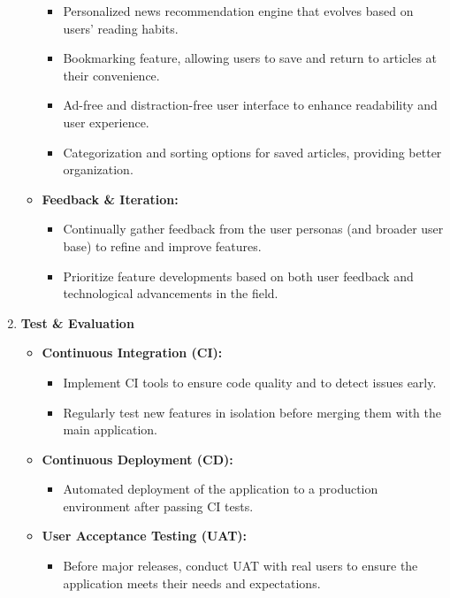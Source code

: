 \documentclass[a4paper]{article}
\begin{document}
\begin{enumerate}
\begin{itemize}
        \begin{itemize}
            \item Personalized news recommendation engine that evolves based on users' reading habits.
            \item Bookmarking feature, allowing users to save and return to articles at their convenience.
            \item Ad-free and distraction-free user interface to enhance readability and user experience.
            \item Categorization and sorting options for saved articles, providing better organization.
        \end{itemize}
        \item \textbf{Feedback \& Iteration:}
        \begin{itemize}
            \item Continually gather feedback from the user personas (and broader user base) to refine and improve features.
            \item Prioritize feature developments based on both user feedback and technological advancements in the field.
        \end{itemize}
    \end{itemize}
    \item \textbf{Test \& Evaluation}
    \begin{itemize}
        \item \textbf{Continuous Integration (CI):}
        \begin{itemize}
            \item Implement CI tools to ensure code quality and to detect issues early.
            \item Regularly test new features in isolation before merging them with the main application.
        \end{itemize}
        \item \textbf{Continuous Deployment (CD):}
        \begin{itemize}
            \item Automated deployment of the application to a production environment after passing CI tests.
        \end{itemize}
        \item \textbf{User Acceptance Testing (UAT):}
        \begin{itemize}
            \item Before major releases, conduct UAT with real users to ensure the application meets their needs and expectations.

\end{itemize}
\end{itemize}
\end{enumerate}
\end{document}
